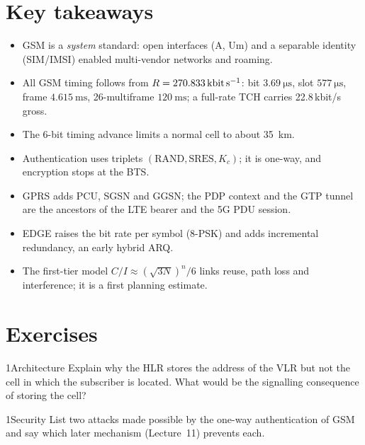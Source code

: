 \documentclass[11pt,a4paper]{article}
\begin{document}
\section{Key takeaways}\label{sec:takeaways}
\begin{takeawaybox}
\begin{itemize}
  \item GSM is a \emph{system} standard: open interfaces (A, Um) and a separable
        identity (SIM/IMSI) enabled multi-vendor networks and roaming.
  \item All GSM timing follows from $R = \qty{270.833}{\kilo\bit\per\second}$: bit
        $\qty{3.69}{\micro\second}$, slot $\qty{577}{\micro\second}$, frame $\qty{4.615}{\milli\second}$,
        26-multiframe $\qty{120}{\milli\second}$; a full-rate TCH carries 22.8\,kbit/s gross.
  \item The 6-bit timing advance limits a normal cell to about \qty{35}{\kilo\metre}.
  \item Authentication uses triplets $(\text{RAND},\text{SRES},K_c)$; it is one-way, and
        encryption stops at the BTS.
  \item GPRS adds PCU, SGSN and GGSN; the PDP context and the GTP tunnel are the
        ancestors of the LTE bearer and the 5G PDU session.
  \item EDGE raises the bit rate per symbol (8-PSK) and adds incremental redundancy,
        an early hybrid ARQ.
  \item The first-tier model $C/I \approx (\sqrt{3N})^n/6$ links reuse, path loss and
        interference; it is a first planning estimate.
\end{itemize}
\end{takeawaybox}

\section{Exercises}\label{sec:exercises}

\begin{exercisebox}{1}{Architecture}\label{exr:arch}
Explain why the HLR stores the address of the VLR but not the cell in which the
subscriber is located. What would be the signalling consequence of storing the cell?
\end{exercisebox}

\begin{exercisebox}{1}{Security}\label{exr:sec}
List two attacks made possible by the one-way authentication of GSM and say which
later mechanism (Lecture~11) prevents each.
\end{exercisebox}
\end{document}
